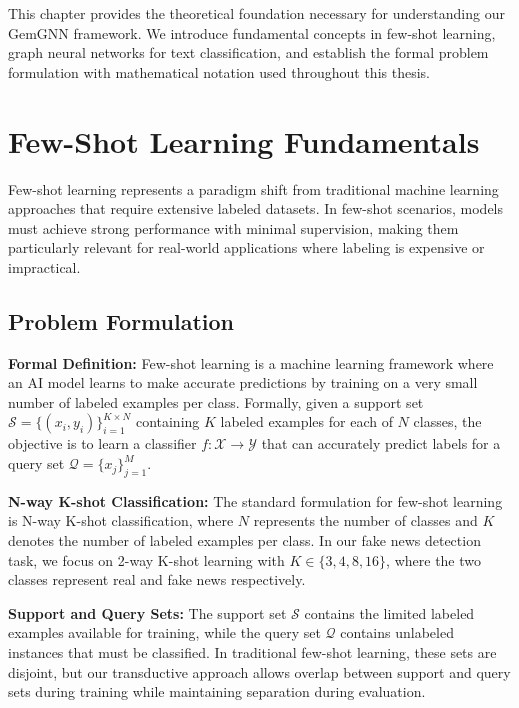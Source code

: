 
This chapter provides the theoretical foundation necessary for understanding our GemGNN framework. We introduce fundamental concepts in few-shot learning, graph neural networks for text classification, and establish the formal problem formulation with mathematical notation used throughout this thesis.

\section{Few-Shot Learning Fundamentals}

Few-shot learning represents a paradigm shift from traditional machine learning approaches that require extensive labeled datasets. In few-shot scenarios, models must achieve strong performance with minimal supervision, making them particularly relevant for real-world applications where labeling is expensive or impractical.

\subsection{Problem Formulation}

\textbf{Formal Definition:} Few-shot learning is a machine learning framework where an AI model learns to make accurate predictions by training on a very small number of labeled examples per class. Formally, given a support set $\mathcal{S} = \{(x_i, y_i)\}_{i=1}^{K \times N}$ containing $K$ labeled examples for each of $N$ classes, the objective is to learn a classifier $f: \mathcal{X} \rightarrow \mathcal{Y}$ that can accurately predict labels for a query set $\mathcal{Q} = \{x_j\}_{j=1}^{M}$.

\textbf{N-way K-shot Classification:} The standard formulation for few-shot learning is N-way K-shot classification, where $N$ represents the number of classes and $K$ denotes the number of labeled examples per class. In our fake news detection task, we focus on 2-way K-shot learning with $K \in \{3, 4, 8, 16\}$, where the two classes represent real and fake news respectively.

\textbf{Support and Query Sets:} The support set $\mathcal{S}$ contains the limited labeled examples available for training, while the query set $\mathcal{Q}$ contains unlabeled instances that must be classified. In traditional few-shot learning, these sets are disjoint, but our transductive approach allows overlap between support and query sets during training while maintaining separation during evaluation.

